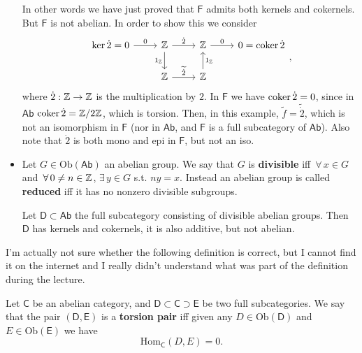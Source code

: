 \begin{ex}
\begin{itemize}
			In other words we have just proved that $\mathsf{F}$ admits both kernels and cokernels.
			But $\mathsf{F}$ is not abelian.
			In order to show this we consider
			\begin{equation}
			\begin{tikzcd}
				\ker \dot{2} = 0 \arrow[r, "0", rightarrow] & \Z \arrow[r, "\dot{2}", rightarrow] \arrow[d, "1_\Z"', rightarrow] &
				\Z \arrow[r, "0", rightarrow] & 0 = \coker \dot{2}\\
				 & \Z \arrow[r, "\widetilde{\dot{2}}", rightarrow] & \Z \arrow[u, "1_\Z"', rightarrow] & 
			\end{tikzcd}
			,\end{equation} 
			where $\dot{2}: \mathbb{Z} \to \mathbb{Z}$ is the multiplication by $2$.
			In $\mathsf{F}$ we have $\operatorname{coker} \dot{2} = 0$, since in $\mathsf{Ab}$ $\operatorname{coker} \dot{2} = \mathbb{Z}/2\mathbb{Z}$, which is torsion.
			Then, in this example, $\widetilde{f} = \widetilde{\dot{2}}$, which is not an isomorphism in $\mathsf{F}$ 
			(nor in $\mathsf{Ab}$, and $\mathsf{F}$ is a full subcategory of $\mathsf{Ab}$).
			Also note that $\dot{2}$ is both mono and epi in $\mathsf{F}$, but not an iso.


		\item Let $G \in \mathrm{Ob} \left(\mathsf{Ab}\right)$ an abelian group. 
			We say that $G$ is \textbf{divisible} iff $\,\forall\, x \in G$ and $\,\forall\,  0 \neq n \in \mathbb{Z}$, $\exists\, y \in G$ s.t. $ny = x$.
			Instead an abelian group is called \textbf{reduced} iff it has no nonzero divisible subgroups.

			Let $\mathsf{D} \subset \mathsf{Ab}$ the full subcategory consisting of divisible abelian groups.
			Then $\mathsf{D}$ has kernels and cokernels, it is also additive, but not abelian.
	\end{itemize}
\end{ex} 

I'm actually not sure whether the following definition is correct, but I cannot find it on the internet and I really didn't understand what was part of the definition during the lecture.
\begin{defn}
	Let $\mathsf{C}$ be an abelian category, and $\mathsf{D} \subset \mathsf{C} \supset \mathsf{E}$ be two full subcategories.
	We say that the pair $\left(\mathsf{D}, \mathsf{E}\right)$ is a \textbf{torsion pair} iff given any $D \in \mathrm{Ob} \left(\mathsf{D}\right)$ and $E \in \mathrm{Ob} \left(\mathsf{E}\right)$ we have
	\begin{equation}
	\mathrm{Hom}_{\mathsf{C}} \left( D, E \right) = 0
	.\end{equation} 
\end{defn}

